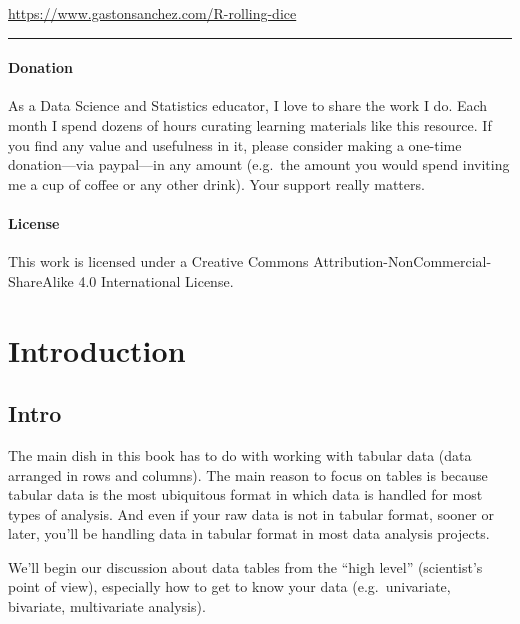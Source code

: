 \documentclass[
]{book}
\begin{document}
\url{https://www.gastonsanchez.com/R-rolling-dice}

\begin{center}\rule{0.5\linewidth}{0.5pt}\end{center}

\hypertarget{donation}{%
\subsection*{Donation}\label{donation}}

As a Data Science and Statistics educator, I love to share the work I do.
Each month I spend dozens of hours curating learning materials like this resource.
If you find any value and usefulness in it, please consider making
a one-time donation---via paypal---in any amount (e.g.~the amount you would spend inviting me a cup of coffee or any other drink). Your support really matters.

\hypertarget{license}{%
\subsection*{License}\label{license}}

This work is licensed under a Creative Commons Attribution-NonCommercial-ShareAlike 4.0 International License.

\hypertarget{part-introduction}{%
\part{Introduction}\label{part-introduction}}

\hypertarget{intro}{%
\chapter{Intro}\label{intro}}

The main dish in this book has to do with working with tabular data
(data arranged in rows and columns). The main reason to focus on tables is
because tabular data is the most ubiquitous format in which data is
handled for most types of analysis. And even if your raw data is not in tabular
format, sooner or later, you'll be handling data in tabular format in most data
analysis projects.

We'll begin our discussion about data tables from the ``high level'' (scientist's
point of view), especially how to get to know your data (e.g.~univariate,
bivariate, multivariate analysis).
\end{document}
